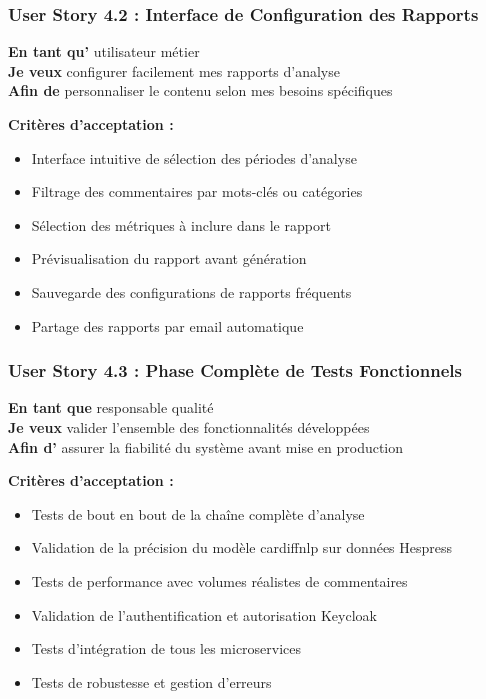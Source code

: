 \subsubsection{User Story 4.2 : Interface de Configuration des Rapports}

\textbf{En tant qu'} utilisateur métier \\
\textbf{Je veux} configurer facilement mes rapports d'analyse \\
\textbf{Afin de} personnaliser le contenu selon mes besoins spécifiques

\textbf{Critères d'acceptation :}
\begin{itemize}
    \item Interface intuitive de sélection des périodes d'analyse
    \item Filtrage des commentaires par mots-clés ou catégories
    \item Sélection des métriques à inclure dans le rapport
    \item Prévisualisation du rapport avant génération
    \item Sauvegarde des configurations de rapports fréquents
    \item Partage des rapports par email automatique
\end{itemize}

\subsubsection{User Story 4.3 : Phase Complète de Tests Fonctionnels}

\textbf{En tant que} responsable qualité \\
\textbf{Je veux} valider l'ensemble des fonctionnalités développées \\
\textbf{Afin d'} assurer la fiabilité du système avant mise en production

\textbf{Critères d'acceptation :}
\begin{itemize}
    \item Tests de bout en bout de la chaîne complète d'analyse
    \item Validation de la précision du modèle cardiffnlp sur données Hespress
    \item Tests de performance avec volumes réalistes de commentaires
    \item Validation de l'authentification et autorisation Keycloak
    \item Tests d'intégration de tous les microservices
    \item Tests de robustesse et gestion d'erreurs
\end{itemize}


